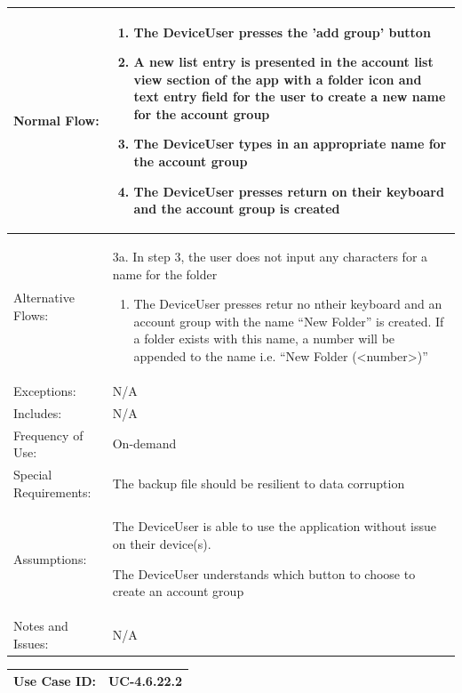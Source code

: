 \documentclass[stu]{apa7}
\newcommand{\nextitem}{\par\hspace*{\labelsep}\textbullet\hspace*{\labelsep}}
\newcommand{\nextitemblank}{\par\hspace*{\labelsep}\hspace*{\labelsep}}
\begin{document}
{{\begin{xltabular}{\textwidth}{|l|X|}
  Normal Flow: &
    \begin{enumerate}
            \item The DeviceUser presses the 'add group' button
            \item A new list entry is presented in the account list view section of the app with a folder icon and text entry field for the user to create a new name for the account group
            \item The DeviceUser types in an appropriate name for the account group
            \item The DeviceUser presses return on their keyboard and the account group is created
    \end{enumerate} \\ \hline

  Alternative Flows: &
                       \nextitemblank 3a. In step 3, the user does not input any characters for a name for the folder
                       \begin{enumerate}
                               \item The DeviceUser presses retur no ntheir keyboard and an account group with the name ``New Folder'' is created. If a folder exists with this name, a number will be appended to the name i.e. ``New Folder (<number>)''
                       \end{enumerate}
              \\ \hline

  Exceptions: &
                N/A
              \\ \hline
  Includes: & N/A \\ \hline

  Frequency of Use: & On-demand \\ \hline

  Special Requirements: & \nextitem The backup file should be resilient to data corruption \\ \hline

  Assumptions: & \nextitem The DeviceUser is able to use the application without issue on their device(s). \nextitem The DeviceUser understands which button to choose to create an account group \\ \hline

  Notes and Issues: & N/A \\ \hline

\end{xltabular}

\scriptsize{\begin{xltabular}{\textwidth}{|l|X|}
  \hline Use Case ID: & UC-4.6.22.2 \\ \hline


\end{xltabular}}}}
\end{document}
